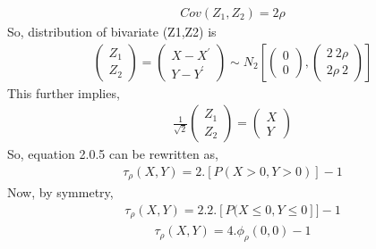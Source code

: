 \documentclass[journal,12pt,twocolumn]{IEEEtran}
\begin{document}
\begin{align}
    Cov(Z_{1},Z_{2}) = 2\rho
\end{align}
So, distribution of bivariate (Z1,Z2) is 
\begin{align}
\begin{pmatrix}Z_{1}\\Z_{2}\end{pmatrix}=\begin{pmatrix}X-X^\prime\\Y-Y^\prime\end{pmatrix} \sim N_{2} \left[\begin{pmatrix}0\\0\end{pmatrix},\begin{pmatrix}2\ 2\rho\\ 2\rho\ 2\end{pmatrix} \right]
\end{align}
This further implies,
\begin{align}
    \frac{1}{\sqrt{2}}\begin{pmatrix}Z_{1}\\Z_{2}\end{pmatrix}=\begin{pmatrix}X\\Y\end{pmatrix}
\end{align}
So, equation 2.0.5 can be rewritten as,
\begin{align}
    \tau_{\rho}(X,Y) = 2.[P(X>0,Y>0)]-1
\end{align}
Now, by symmetry,
\begin{align}
    \tau_{\rho}(X,Y) = 2.2.[P(X\leq0,Y\leq0]]-1
\end{align}
\begin{align}
    \tau_{\rho}(X,Y) = 4.\phi_{\rho}(0,0)-1
\end{align}
\end{document}
